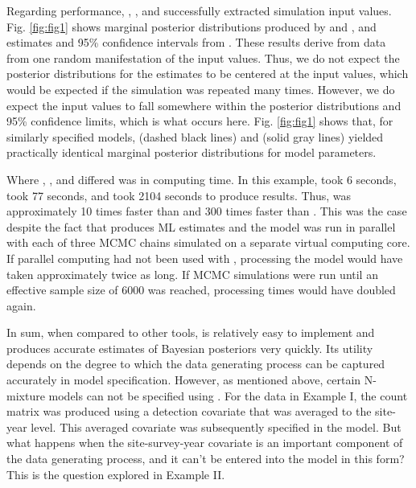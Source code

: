 \documentclass[article]{jss}
\begin{document}
Regarding performance, , , and  successfully extracted simulation input values. Fig. \ref{fig:fig1} shows marginal posterior distributions produced by  and , and estimates and 95\% confidence intervals from . These results derive from data from one random manifestation of the input values. Thus, we do not expect the posterior distributions for the estimates to be centered at the input values, which would be expected if the simulation was repeated many times. However, we do expect the input values to fall somewhere within the posterior distributions and 95\% confidence limits, which is what occurs here.  Fig. \ref{fig:fig1} shows that, for similarly specified models,  (dashed black lines) and  (solid gray lines) yielded practically identical marginal posterior distributions for model parameters.

Where , , and  differed was in computing time.  In this example,  took 6 seconds,  took 77 seconds, and  took 2104 seconds to produce results. Thus,  was approximately 10 times faster than  and 300 times faster than . This was the case despite the fact that  produces ML estimates and the  model was run in parallel with each of three MCMC chains simulated on a separate virtual computing core. If parallel computing had not been used with , processing the  model would have taken approximately twice as long. If MCMC simulations were run until an effective sample size of 6000 was reached, processing times would have doubled again.

In sum, when compared to other tools,  is relatively easy to implement and produces accurate estimates of Bayesian posteriors very quickly. Its utility depends on the degree to which the data generating process can be captured accurately in model specification. However, as mentioned above, certain N-mixture models can not be specified using . For the data in Example I, the count matrix was produced using a detection covariate that was averaged to the site-year level. This averaged covariate was subsequently specified in the model. But what happens when the site-survey-year covariate is an important component of the data generating process, and it can't be entered into the model in this form? This is the question explored in Example II.
\end{document}
